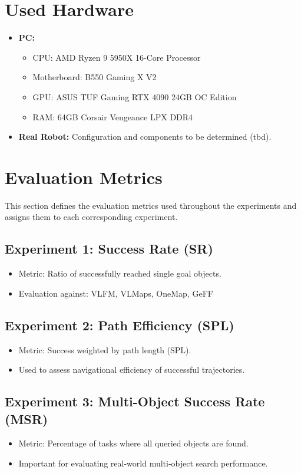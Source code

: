 \section{Used Hardware}
\begin{itemize}
    \item \textbf{PC:}
    \begin{itemize}
        \item CPU: AMD Ryzen 9 5950X 16-Core Processor
        \item Motherboard: B550 Gaming X V2
        \item GPU: ASUS TUF Gaming RTX 4090 24GB OC Edition
        \item RAM: 64GB Corsair Vengeance LPX DDR4
    \end{itemize}
    \item \textbf{Real Robot:} Configuration and components to be determined (tbd).
\end{itemize}

\section{Evaluation Metrics}
This section defines the evaluation metrics used throughout the experiments and assigns them to each corresponding experiment.

\subsection{Experiment 1: Success Rate (SR)}
\begin{itemize}
    \item Metric: Ratio of successfully reached single goal objects.
    \item Evaluation against: \ac{VLFM}, \ac{VLMaps}, \ac{OneMap}, \ac{GeFF}
\end{itemize}

\subsection{Experiment 2: Path Efficiency (SPL)}
\begin{itemize}
    \item Metric: Success weighted by path length (SPL).
    \item Used to assess navigational efficiency of successful trajectories.
\end{itemize}

\subsection{Experiment 3: Multi-Object Success Rate (MSR)}
\begin{itemize}
    \item Metric: Percentage of tasks where all queried objects are found.
    \item Important for evaluating real-world multi-object search performance.
\end{itemize}

